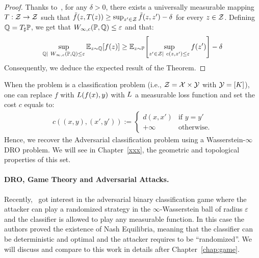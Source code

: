 \begin{proof}
    Thanks to~\citet[Proposition 7.50]{bertsekas2004stochastic}, for any $\delta>0$, there exists a universally measurable mapping $T:\mathcal{Z}\to\mathcal{Z}$ such that $\tilde{f}(z,T(z))\geq \sup_{z'\in\mathcal{Z}} \Tilde{f}(z,z') -\delta $ for every $z\in\mathcal{Z}$. Defining $\mathbb{Q} =T_\sharp\mathbb{P}$, we get that $W_{\infty,c}(\mathbb{P},\mathbb{Q})\leq \varepsilon$ and that:
    \begin{align*}
        \sup_{\QQ|~W_{\infty,c}(\PP,\QQ)\leq \varepsilon}\mathbb{E}_{z\sim\QQ}\left[f(z)\right] \geq\mathbb{E}_{z\sim\PP}\left[\sup_{z'\in \ZZ|~c(z,z')\leq\varepsilon} f(z')\right]-\delta
    \end{align*}
Consequently, we deduce the expected result of the Theorem.
\end{proof}
    

When the problem is a classification problem (i.e., $\mathcal{Z}=\mathcal{X}\times\mathcal{Y}$ with $\mathcal{Y} = [K]$), one can replace $f$ with  $L(f(x),y)$ with $L$ a measurable loss function and set the cost $c$ equals to:
\begin{align*}
    c((x,y),(x',y')) := \left\{
        \begin{array}{ll}
            d(x,x') & \mbox{if } y = y'\\
            +\infty & \mbox{otherwise.}
        \end{array}
    \right.
\end{align*} 
Hence, we recover the Adversarial classification problem using a Wasserstein-$\infty$ DRO problem. We will see in Chapter~\ref{xxx}, the geometric and topological properties of this set. 

\paragraph{DRO, Game Theory and Adversarial Attacks.} Recently,~\citet{pydi2021many} got interest in the adversarial binary classification game where the attacker can play a randomized strategy in the $\infty$-Wasserstein ball of radius $\varepsilon$ and the classifier is allowed to play any measurable function. In this case the authors proved the existence of Nash Equilibria, meaning that the classifier can be deterministic and optimal and the attacker requires to be ``randomized''. We will discuss and compare to this work in details after Chapter~\ref{chap:game}.

